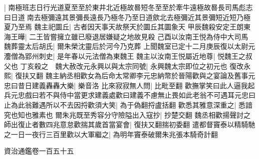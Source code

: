 |{
	南極班志日行光道夏至至於東井北近極故晷短冬至至於牽牛遠極故晷長司馬彪志曰日道南去極彌遠其景彌長遠長乃極冬乃至日道歛北去極彌近其景彌短近短乃極夏乃至焉}
魏主祀圜丘|{
	古者因天事天故祭天於圜丘其圜象天}
甲辰魏殺安定王朗東海王曄|{
	二王皆嘗擁立雖已廢退居嫌疑之地故見殺}
己酉以汝南王悦為侍中大司馬　魏葬靈太后胡氏|{
	爾朱榮沈靈后於河今乃克葬}
上聞魏室已定十二月庚辰復以太尉元灋僧為郢州刺史|{
	是年春以元法僧為東魏王}
魏主以汝南王悦屬近地尊|{
	悦魏王之叔父也}
丁亥殺之　魏大赦改元永興以與太宗同號|{
	永興魏太宗即位之初元也}
復改永熙|{
	復扶又翻}
魏主納丞相歡女為后命太常卿李元忠納幣於晉陽歡與之宴論及舊事元忠曰昔日建義轟轟大樂|{
	樂音洛}
比來寂寂無人問|{
	比毗至翻}
歡撫掌笑曰此人逼我起兵元忠戲曰若不與侍中當更求建義處歡曰建義不慮無止畏如此老翁不可遇耳元忠曰止為此翁難遇所以不去因捋歡須大笑|{
	為于偽翻捋盧括翻}
歡悉其雅意深重之|{
	悉諳究也知也雅素也}
爾朱兆既至秀容分守險隘出入寇抄|{
	抄楚交翻}
魏丞相歡揚聲討之師出復止者數四兆意怠歡揣其歲首當宴會|{
	復扶又翻揣初委翻}
遣都督竇泰以精騎馳之一日一夜行三百里歡以大軍繼之|{
	為明年竇泰破爾朱兆張本騎奇計翻}


資治通鑑卷一百五十五
